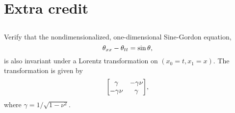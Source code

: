 \documentclass[11pt]{article}
\newcommand{\beq}{\begin{equation*}}
\newcommand{\eeq}{\end{equation*}}
\newcommand{\beqn}{\begin{equation}}
\newcommand{\eeqn}{\end{equation}}
\newenvironment{problem}
{
	\subsection{}
	\color{darkgray}
    \ignorespaces
}
{

}
\begin{document}







\newcommand{\gam}{\gamma}
\newcommand{\xo}{x_0}
\newcommand{\xq}{x_1}
\newcommand{\tlt}{\tilde{t}}

\section{Extra credit}
\begin{problem}
	Verify that the nondimensionalized, one-dimensional Sine-Gordon equation,
	\beqn \label{sg}
		\thtxx - \thttt = \sint,
	\eeqn
	is also invariant under a Lorentz transformation on $(\xo = t, \xq = x)$.  The transformation is given by
	\beq
		\mqty[	\gam & -\gam \nu \\
				-\gam \nu & \gam ],
	\eeq
	where $\gam = 1 / \sqrt{1 - \nu^2}$.
\end{problem}
\end{document}
